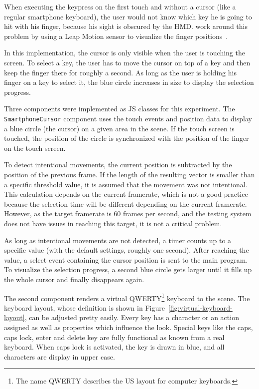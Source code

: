 When executing the keypress on the first touch and without a cursor (like a regular smartphone keyboard), the user would not know which key he is going to hit with his finger, because his sight is obscured by the \ac{HMD}. \citeauthor{Dias.2018} work around this problem by using a Leap Motion sensor to visualize the finger positions~\cite[4]{Dias.2018}.

In this implementation, the cursor is only visible when the user is touching the screen. To select a key, the user has to move the cursor on top of a key and then keep the finger there for roughly a second. As long as the user is holding his finger on a key to select it, the blue circle increases in size to display the selection progress.

Three components were implemented as \acl{JS} classes for this experiment. The \lstinline{SmartphoneCursor} component uses the touch events and position data to display a blue circle (the cursor) on a given area in the scene. If the touch screen is touched, the position of the circle is synchronized with the position of the finger on the touch screen.

To detect intentional movements, the current position is subtracted by the position of the previous frame. If the length of the resulting vector is smaller than a specific threshold value, it is assumed that the movement was not intentional. This calculation depends on the current framerate, which is not a good practice because the selection time will be different depending on the current framerate. However, as the target framerate is 60 frames per second, and the testing system does not have issues in reaching this target, it is not a critical problem.

As long as intentional movements are not detected, a timer counts up to a specific value (with the default settings, roughly one second). After reaching the value, a select event containing the cursor position is sent to the main program. To visualize the selection progress, a second blue circle gets larger until it fills up the whole cursor and finally disappears again.

The second component renders a virtual QWERTY\footnote{The name QWERTY describes the US layout for computer keyboards.} keyboard to the scene. The keyboard layout, whose definition is shown in Figure~\ref{fig:virtual-keyboard-layout}, can be adjusted pretty easily. Every key has a character or an action assigned as well as properties which influence the look. Special keys like the caps, caps lock, enter and delete key are fully functional as known from a real keyboard. When caps lock is activated, the key is drawn in blue, and all characters are display in upper case.

